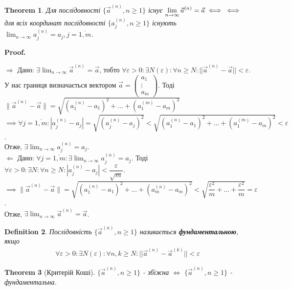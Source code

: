 \documentclass[a4paper, 10pt]{article}
\makeatletter
\def\huge{\displaystyle}
\def\qed{$\blacksquare$}
\def\rightproof{$\boxed{\Rightarrow}$ }
\def\leftproof{$\boxed{\Leftarrow}$ }
\theoremstyle{theoremdd}
\newtheorem{theorem}{Theorem}[subsection]
\theoremstyle{theoremdd}
\theoremstyle{theoremdd}
\newtheorem{definition}[theorem]{Definition}
\theoremstyle{theoremdd}
\theoremstyle{theoremdd}
\theoremstyle{theoremdd}
\theoremstyle{theoremdd}
\theoremstyle{theoremdd}
\theoremstyle{theoremdd}
\renewenvironment{proof}[1][Proof.\\]{\par
\pushQED{\hfill \qed}%
\normalfont \topsep6\p@\@plus6\p@\relax
\trivlist
\item\relax
{\bfseries
#1\@addpunct{.}}\hspace\labelsep\ignorespaces
}{%
\popQED\endtrivlist\@endpefalse
}
\newcommand\Norm[1]{\lVert#1\rVert}
\makeatother
\begin{document}
\begin{theorem}
Для послідовності $\{\vec{a}^{(n)}, n \geq 1 \}$ існує $\huge \lim_{n \to \infty} \vec{a}^{(n)} = \vec{a} \iff \\ \iff$ для всіх координат послідовності $\{a_j^{(n)}, n \geq 1\}$ існують $\huge \lim_{n \to \infty} a_j^{(n)} = a_j, j = \overline{1,m}$.
\end{theorem}

\begin{proof}
\rightproof Дано: $\exists \huge \lim_{n \to \infty} \vec{a}^{(n)} = \vec{a}$, тобто $\huge \forall \varepsilon > 0: \exists N(\varepsilon): \forall n \geq N: ||\vec{a}^{(n)} - \vec{a}|| < \varepsilon$.\\
У нас границя визначається вектором $\vec{a} = \begin{pmatrix}
a_1 \\ \vdots \\ a_m
\end{pmatrix}$. Тоді 
$\Norm{\vec{a}^{(n)} - \vec{a}} = \sqrt{(a_1^{(n)} - a_1)^2 + \dots + (a_1^{(m)} - a_m)^2}$\\
$\implies \forall j = \overline{1,m}: |a_j^{(n)} - a_j| = \sqrt{(a_j^{(n)} - a_j)^2} < \sqrt{(a_1^{(n)} - a_1)^2 + \dots + (a_1^{(m)} - a_m)^2} < \varepsilon$.\\
Отже, $\exists \huge \lim_{n \to \infty} a_j^{(n)} = a_j$.
\bigskip \\
\leftproof Дано: $\forall j = \overline{1,m}: \exists \huge \lim_{n \to \infty} a_j^{(n)} = a_j$. Тоді $\forall \varepsilon > 0: \exists N: \forall n \geq N: |a_j^{(n)} - a_j| < \dfrac{\varepsilon}{\sqrt{m}}$.\\
$\implies \Norm{\vec{a}^{(n)} - \vec{a}} = \sqrt{(a_1^{(n)} - a_1)^2 + \dots + (a_m^{(n)} - a_m)^2} < \sqrt{\dfrac{\varepsilon^2}{m} + \dots + \dfrac{\varepsilon^2}{m}} = \varepsilon$.\\
Отже, $\exists \huge \lim_{n \to \infty} \vec{a}^{(n)} = \vec{a}$.
\end{proof}

\begin{definition}
Послідовність $\{\vec{a}^{(n)}, n \geq 1 \}$ називається \textbf{фундаментальною}, якщо
\begin{align*}
\forall \varepsilon > 0: \exists N(\varepsilon): \forall n, k \geq N: ||\vec{a}^{(n)} - \vec{a}^{(k)}|| < \varepsilon
\end{align*}
\end{definition}

\begin{theorem}[Критерій Коші]
$\{\vec{a}^{(n)}, n \geq 1 \}$ - збіжна $\iff$ $\{\vec{a}^{(n)}, n \geq 1 \}$ - фундаментальна.
\end{theorem}
\end{document}
